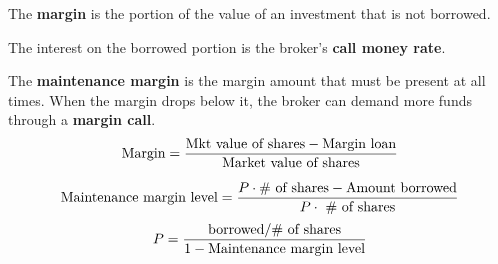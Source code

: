 \documentclass[english, 12pt]{article}
\begin{document}
\begin{defn}
The \textbf{margin} is the portion of the value of an investment that is not borrowed.
\end{defn}

\begin{defn}
The interest on the borrowed portion is the broker's \textbf{call money rate}.
\end{defn}

\begin{defn}
The \textbf{maintenance margin} is the margin amount that must be present at all times. When the margin drops below it, the broker can demand more funds through a \textbf{margin call}.
\[ \text{Margin} = \frac{\text{Mkt value of shares} - \text{Margin loan}}{\text{Market value of shares}}\]

\[\text{Maintenance margin level} = \frac{P \cdot \text{\# of shares} - \text{Amount borrowed}}{P \cdot \text{ \# of shares}}\]
\[P = \frac{\text{borrowed} / \text{\# of shares}}{1-\text{Maintenance margin level}}\]
\end{defn}
\end{document}
